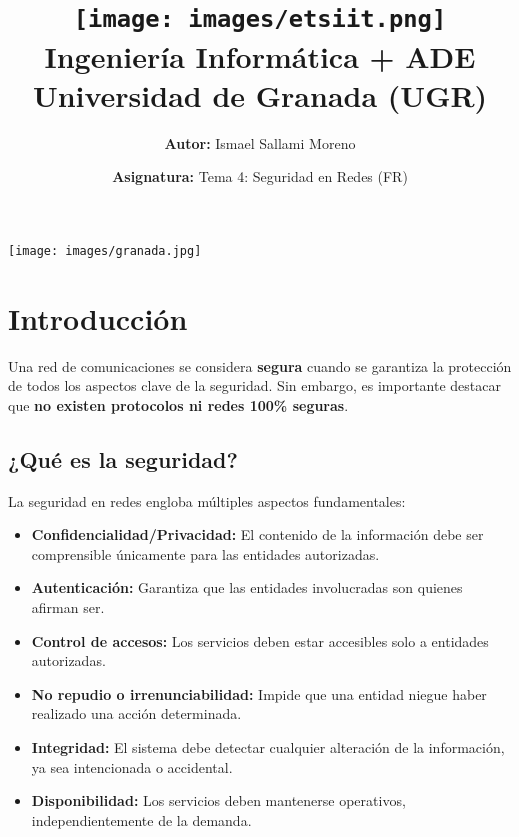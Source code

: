 \documentclass[a4paper,12pt]{article}
\title{
    \vspace{-2cm}
    \texttt{[image: images/etsiit.png]} \\ %
    \LARGE Ingeniería Informática + ADE\\
    \large Universidad de Granada (UGR)\\[1cm]
}
\author{\textbf{Autor:} Ismael Sallami Moreno}
\date{\textbf{Asignatura:} Tema 4: Seguridad en Redes (FR)\\[1cm]}
\begin{document}
\maketitle
\thispagestyle{empty}

\begin{center}
    \texttt{[image: images/granada.jpg]} \\ %
    \vfill
\end{center}

\newpage

\tableofcontents
\newpage


\section{Introducción}

Una red de comunicaciones se considera \textbf{segura} cuando se garantiza la protección de todos los aspectos clave de la seguridad. Sin embargo, es importante destacar que \textbf{no existen protocolos ni redes 100\% seguras}.

\subsection{¿Qué es la seguridad?}

La seguridad en redes engloba múltiples aspectos fundamentales:

\begin{itemize}
    \item \textbf{Confidencialidad/Privacidad:} El contenido de la información debe ser comprensible únicamente para las entidades autorizadas.
    \item \textbf{Autenticación:} Garantiza que las entidades involucradas son quienes afirman ser.
    \item \textbf{Control de accesos:} Los servicios deben estar accesibles solo a entidades autorizadas.
    \item \textbf{No repudio o irrenunciabilidad:} Impide que una entidad niegue haber realizado una acción determinada.
    \item \textbf{Integridad:} El sistema debe detectar cualquier alteración de la información, ya sea intencionada o accidental.
    \item \textbf{Disponibilidad:} Los servicios deben mantenerse operativos, independientemente de la demanda.
\end{itemize}
\end{document}
